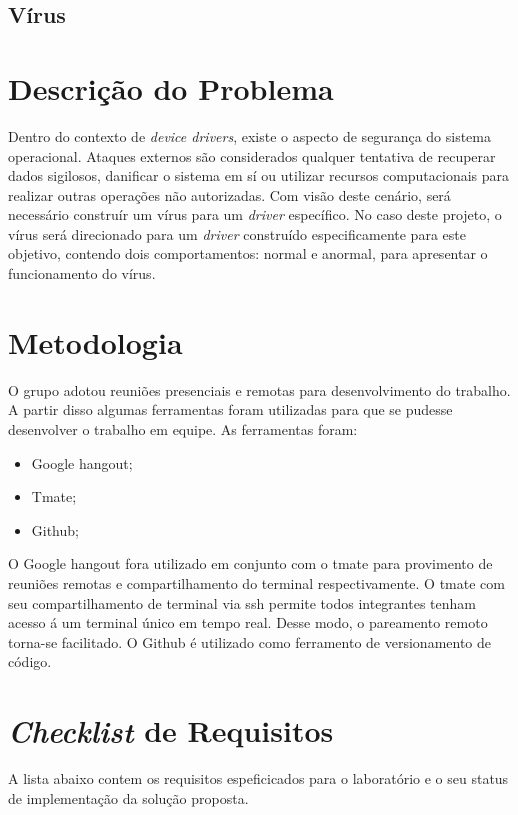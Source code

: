\subsection{Vírus}

\section{Descrição do Problema}

Dentro do contexto de \textit{device drivers}, existe o aspecto de segurança do sistema operacional.
Ataques externos são considerados qualquer tentativa de recuperar dados sigilosos, danificar
o sistema em sí ou utilizar recursos computacionais para realizar outras operações não autorizadas.
Com visão deste cenário, será necessário construír um vírus para um \textit{driver} específico.
No caso deste projeto, o vírus será direcionado para um \textit{driver} construído especificamente para
este objetivo, contendo dois comportamentos: normal e anormal, para apresentar o
funcionamento do vírus.

\section{Metodologia}

O grupo adotou reuniões presenciais e remotas para desenvolvimento do trabalho. A partir
disso algumas ferramentas foram utilizadas para que se pudesse desenvolver o trabalho em
equipe. As ferramentas foram:

\begin{itemize}
  \item Google hangout;
  \item Tmate;
  \item Github;
\end{itemize}

O Google hangout fora utilizado em conjunto com o tmate para provimento de reuniões remotas
e compartilhamento do terminal respectivamente. O tmate com seu compartilhamento de terminal
via ssh permite todos integrantes tenham acesso á um terminal único em tempo real. Desse modo,
o pareamento remoto torna-se facilitado. O Github é utilizado como ferramento de versionamento
de código. 

\section{\textit{Checklist} de Requisitos}

A lista abaixo contem os requisitos espeficicados para o laboratório e o
seu status de implementação da solução proposta.

